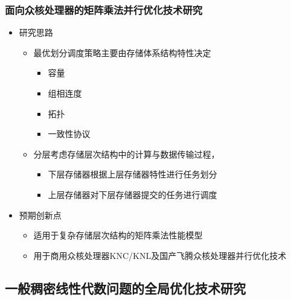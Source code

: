 \documentclass[aspectratio=169]{beamer}
\begin{document}
\begin{frame}
  \frametitle{面向众核处理器的矩阵乘法并行优化技术研究}
  \begin{itemize}
  \item 研究思路
    \begin{itemize}
    \item 最优划分调度策略主要由存储体系结构特性决定
      \begin{itemize}
      \item 容量
      \item 组相连度
      \item 拓扑
      \item 一致性协议
      \end{itemize}
    \item 分层考虑存储层次结构中的计算与数据传输过程，
      \begin{itemize}
      \item 下层存储器根据上层存储器特性进行任务划分
      \item 上层存储器对下层存储器提交的任务进行调度
      \end{itemize}
    \end{itemize}
  \item 预期创新点
    \begin{itemize}
    \item 适用于复杂存储层次结构的矩阵乘法性能模型
    \item 用于商用众核处理器KNC/KNL及国产飞腾众核处理器并行优化技术
    \end{itemize}
  \end{itemize}
\end{frame}


\subsection[全局优化技术研究]{一般稠密线性代数问题的全局优化技术研究}
\end{document}

